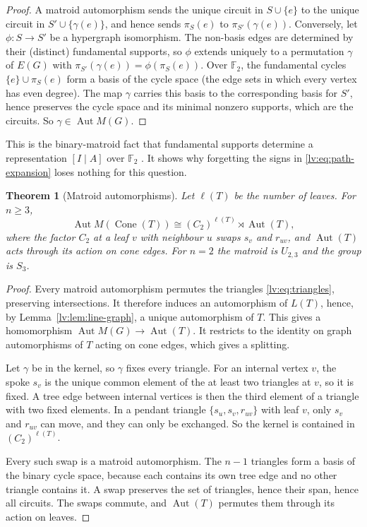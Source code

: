 \documentclass[11pt,a4paper]{article}
\newtheorem{theorem}{Theorem}[section]
\theoremstyle{definition}
\theoremstyle{remark}
\newcommand{\Cone}{\operatorname{Cone}}
\newcommand{\Aut}{\operatorname{Aut}}
\begin{document}
\begin{proof}
A matroid automorphism sends the unique circuit in $S\cup\{e\}$ to the unique circuit in $S'\cup\{\gamma(e)\}$, and hence sends $\pi_S(e)$ to $\pi_{S'}(\gamma(e))$. Conversely, let $\phi:S\to S'$ be a hypergraph isomorphism. The non-basis edges are determined by their (distinct) fundamental supports, so $\phi$ extends uniquely to a permutation $\gamma$ of $E(G)$ with $\pi_{S'}(\gamma(e))=\phi(\pi_S(e))$. Over $\mathbb F_2$, the fundamental cycles $\{e\}\cup\pi_S(e)$ form a basis of the cycle space (the edge sets in which every vertex has even degree). The map $\gamma$ carries this basis to the corresponding basis for $S'$, hence preserves the cycle space and its minimal nonzero supports, which are the circuits. So $\gamma\in\Aut M(G)$.
\end{proof}

This is the binary-matroid fact that fundamental supports determine a representation $[I\mid A]$ over $\mathbb F_2$ \cite[\S6.4]{lv:Oxley2011}. It shows why forgetting the signs in \eqref{lv:eq:path-expansion} loses nothing for this question.

\begin{theorem}[Matroid automorphisms]
\label{lv:thm:automorphisms}
Let $\ell(T)$ be the number of leaves. For $n\geq3$,
\begin{equation}
 \Aut M(\Cone(T))\cong (C_2)^{\ell(T)}\rtimes\Aut(T),
 \label{lv:eq:automorphism-group}
\end{equation}
where the factor $C_2$ at a leaf $v$ with neighbour $u$ swaps $s_v$ and $r_{uv}$, and $\Aut(T)$ acts through its action on cone edges. For $n=2$ the matroid is $U_{2,3}$ and the group is $S_3$.
\end{theorem}

\begin{proof}
Every matroid automorphism permutes the triangles \eqref{lv:eq:triangles}, preserving intersections. It therefore induces an automorphism of $L(T)$, hence, by Lemma~\ref{lv:lem:line-graph}, a unique automorphism of $T$. This gives a homomorphism $\Aut M(G)\to\Aut(T)$. It restricts to the identity on graph automorphisms of $T$ acting on cone edges, which gives a splitting.

Let $\gamma$ be in the kernel, so $\gamma$ fixes every triangle. For an internal vertex $v$, the spoke $s_v$ is the unique common element of the at least two triangles at $v$, so it is fixed. A tree edge between internal vertices is then the third element of a triangle with two fixed elements. In a pendant triangle $\{s_u,s_v,r_{uv}\}$ with leaf $v$, only $s_v$ and $r_{uv}$ can move, and they can only be exchanged. So the kernel is contained in $(C_2)^{\ell(T)}$.

Every such swap is a matroid automorphism. The $n-1$ triangles form a basis of the binary cycle space, because each contains its own tree edge and no other triangle contains it. A swap preserves the set of triangles, hence their span, hence all circuits. The swaps commute, and $\Aut(T)$ permutes them through its action on leaves.
\end{proof}
\end{document}

